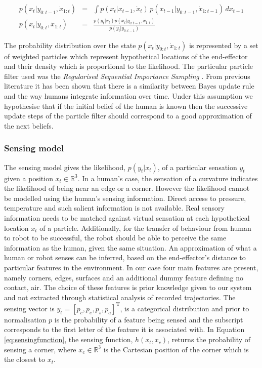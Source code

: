 \begin{eqnarray}
 p(x_{t}|y_{0:t-1},\dot{x}_{1:t}) &=& \int p(x_{t}|x_{t-1},\dot{x}_{t})\,p(x_{t-1}|y_{0:t-1},\dot{x}_{1:t-1})\,dx_{t-1} \\
 p(x_{t}|y_{0:t},\dot{x}_{1:t}) &=& \frac{p(y_{t}|x_{t})p(x_{t}|y_{0:t-1},\dot{x}_{1:t})}{p(y_{t}|y_{0:t-1})}
\end{eqnarray}

The probability distribution over the state $p(x_{t}|y_{0:t},\dot{x}_{1:t})$ is represented by a set of weighted particles which represent hypothetical
locations of the end-effector and  their density which is proportional to the likelihood. The particular particle filter used was the 
\textit{Regularised Sequential Importance Sampling} \cite[p.182]{Arul_Mask_Clap_2002}. From previous literature \cite{Bake_Saxe_Tene_2011} 
it has been shown that there is a similarity between Bayes update rule and the way humans integrate information over time. Under this assumption 
we hypothesise that if the initial belief of the human is known then the successive update steps of the particle filter should correspond to a good approximation 
of the next beliefs. 

\subsubsection{Sensing model}

The sensing model gives the likelihood, $p(y_t|x_t)$, of a particular sensation $y_t$ given
a position $x_t \in \mathbb{R}^{3}$. In a human's case, the sensation of a curvature indicates the 
likelihood of being near an edge or a corner. However the likelihood cannot be modelled using 
the human's sensing information. Direct access to pressure, temperature and such salient information is not available. 
Real sensory information needs to be matched against virtual sensation at each hypothetical location $x_t$ of a particle. 
Additionally,  for the transfer of behaviour from human to robot to be successful, the robot should be
able to perceive the same information as the human, given the same situation. An approximation of what a human or robot senses 
can be inferred, based on the end-effector's distance to particular features in the environment. In our case four main features 
are present, namely corners, edges, surfaces and an additional dummy feature defining no contact, air. The choice of these features is prior knowledge 
given to our system and not extracted through statistical analysis of recorded trajectories. The sensing vector is $y_t = \left[p_c,p_e,p_s,p_a\right]^{\mathrm{T}}$, 
is a categorical distribution and prior to normalisation $p$ is the probability of a feature being sensed and the subscript corresponds to 
the first letter of the feature it is associated with. In Equation \ref{eq:sensingfunction}, 
the sensing function, $h(x_t,x_c)$, returns the probability of sensing a corner, where $x_c \in \mathbb{R}^3$ is the Cartesian position of the corner which is
the closest to $x_t$. 

